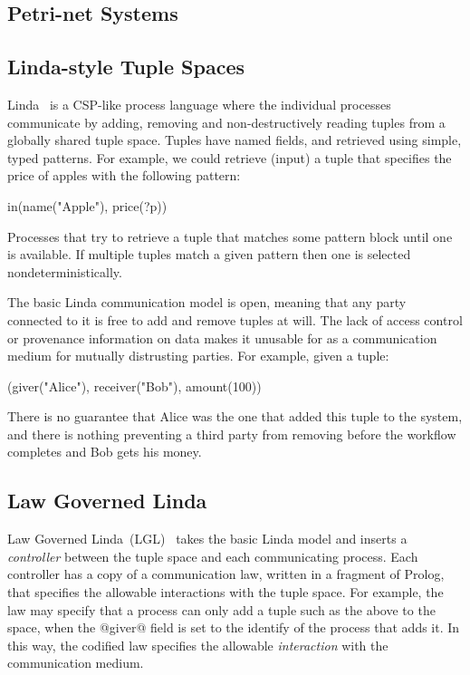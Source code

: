 \subsection{Petri-net Systems}



\subsection{Linda-style Tuple Spaces}
Linda~\cite{Gelernter1985:Linda} is a CSP-like process language where the individual processes communicate by adding, removing and non-destructively reading tuples from a globally shared tuple space. Tuples have named fields, and retrieved using simple, typed patterns. For example, we could retrieve (input) a tuple that specifies the price of apples with the following pattern:
\begin{code}
   in(name("Apple"), price(?p))
\end{code}
Processes that try to retrieve a tuple that matches some pattern block until one is available. If multiple tuples match a given pattern then one is selected nondeterministically.

The basic Linda communication model is open, meaning that any party connected to it is free to add and remove tuples at will. The lack of access control or provenance information on data makes it unusable for as a communication medium for mutually distrusting parties. For example, given a tuple:
\begin{code}
   (giver("Alice"), receiver("Bob"), amount(100))
\end{code}
There is no guarantee that Alice was the one that added this tuple to the system, and there is nothing preventing a third party from removing before the workflow completes and Bob gets his money.

\subsection{Law Governed Linda}
Law Governed Linda~(LGL)~\cite{Minsky1994:LawGovernedLinda} takes the basic Linda model and inserts a \emph{controller} between the tuple space and each communicating process. Each controller has a copy of a communication law, written in a fragment of Prolog, that specifies the allowable interactions with the tuple space. For example, the law may specify that a process can only add a tuple such as the above to the space, when the @giver@ field is set to the identify of the process that adds it. In this way, the codified law specifies the allowable \emph{interaction} with the communication medium.


